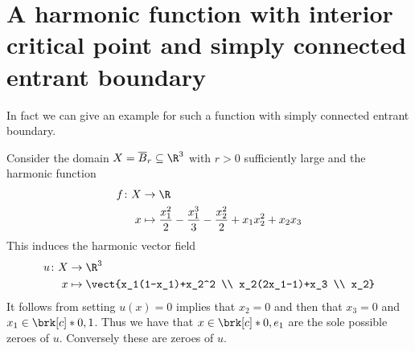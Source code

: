 \section{A harmonic function with interior critical point and simply connected entrant boundary}
In fact we can give an example for such a function with
simply connected entrant boundary.
\begin{example}
  Consider the domain $X=\overline{B}_r\subseteq\R^3$ with $r>0$ sufficiently large and the harmonic function
  \begin{align*}
    f\colon X&\to\R \\
    x&\mapsto \frac{x_1^2}{2}-\frac{x_1^3}{3}-\frac{x_2^2}{2}+x_1x_2^2+x_2x_3
  \end{align*}
  This induces the harmonic vector field
  \begin{align*}
    u\colon X&\to\R^3 \\
    x&\mapsto\vect{x_1(1-x_1)+x_2^2 \\
      x_2(2x_1-1)+x_3 \\
      x_2}
  \end{align*}
  It follows from setting $u(x)=0$ implies that $x_2=0$
  and then that $x_3=0$ and $x_1\in\brk[c]*{0,1}$. Thus we have that $x\in\brk[c]*{0,e_1}$
  are the sole possible zeroes of $u$. Conversely these are zeroes of $u$.


\end{example}

